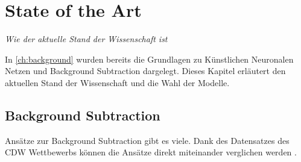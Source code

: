 \chapter{State of the Art} \label{ch:sota}

\begin{center}
    \textit{Wie der aktuelle Stand der Wissenschaft ist}
\end{center}

In \autoref{ch:background} wurden bereits die Grundlagen zu Künstlichen Neuronalen Netzen und Background Subtraction dargelegt.
Dieses Kapitel erläutert den aktuellen Stand der Wissenschaft und die Wahl der Modelle.




\section{Background Subtraction}
Ansätze zur Background Subtraction gibt es viele.
Dank des Datensatzes des \ac{CDW} Wettbewerbs können die Ansätze direkt miteinander verglichen werden \cite{goyette_changedetection.net:_2012}.

